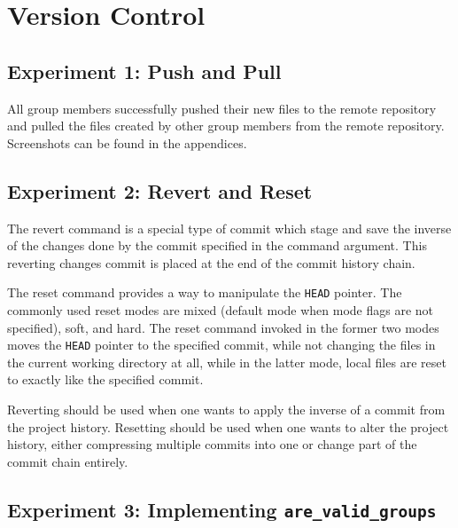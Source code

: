 \documentclass[titlepage, 12pt]{article}
\begin{document}
\newpage{}

\section{Version Control}
\label{sec:git}

\subsection{Experiment 1: Push and Pull}
All group members successfully pushed their new files to the remote repository
and pulled the files created by other group members from the remote repository.
Screenshots can be found in the appendices.

\subsection{Experiment 2: Revert and Reset}

The revert command is a special type of commit which stage and save the inverse
of the changes done by the commit specified in the command argument. This
reverting changes commit is placed at the end of the commit history chain.

The reset command provides a way to manipulate the \verb|HEAD| pointer. The
commonly used reset modes are mixed (default mode when mode flags are not
specified), soft, and hard. The reset command invoked in the former two modes
moves the \verb|HEAD| pointer to the specified commit, while not changing the
files in the current working directory at all, while in the latter mode, local
files are reset to exactly like the specified commit.

Reverting should be used when one wants to apply the inverse of a commit from
the project history. Resetting should be used when one wants to alter the
project history, either compressing multiple commits into one or change part of
the commit chain entirely.

\subsection{Experiment 3: Implementing \texttt{are\_valid\_groups}}
\end{document}

